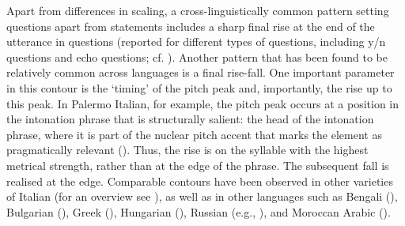 Apart from differences in scaling, a cross-linguistically common pattern setting questions apart from statements includes a sharp final rise at the end of the utterance in questions (reported for different types of questions, including y/n questions and echo questions; cf. \citealt{Bolinger1978}). Another pattern that has been found to be relatively common across languages is a final rise-fall. One important parameter in this contour is the ‘timing’ of the pitch peak and, importantly, the rise up to this peak. In Palermo Italian, for example, the pitch peak occurs at a position in the intonation phrase that is structurally salient: the head of the intonation phrase, where it is part of the nuclear pitch accent that marks the element as pragmatically relevant (\citealt{Grice1995}). Thus, the rise is on the syllable with the highest metrical strength, rather than at the edge of the phrase. The subsequent fall is realised at the edge. Comparable contours have been observed in other varieties of Italian  (for an overview see \citealt{Grice.etal2005ita,SavinoGrice2011}), as well as in other languages such as Bengali  (\citealt{HayesLahiri1991}), Bulgarian (\citealt{Grice.etal1995}), Greek (\citealt{Arvaniti2001,ArvanitiLadd2009}), Hungarian (\citealt{Ladd1983,GosyTerken1994,Varga2002}), Russian (e.g., \citealt{Makarova2007}), and Moroccan Arabic (\citealt{Benkirane1998}).

